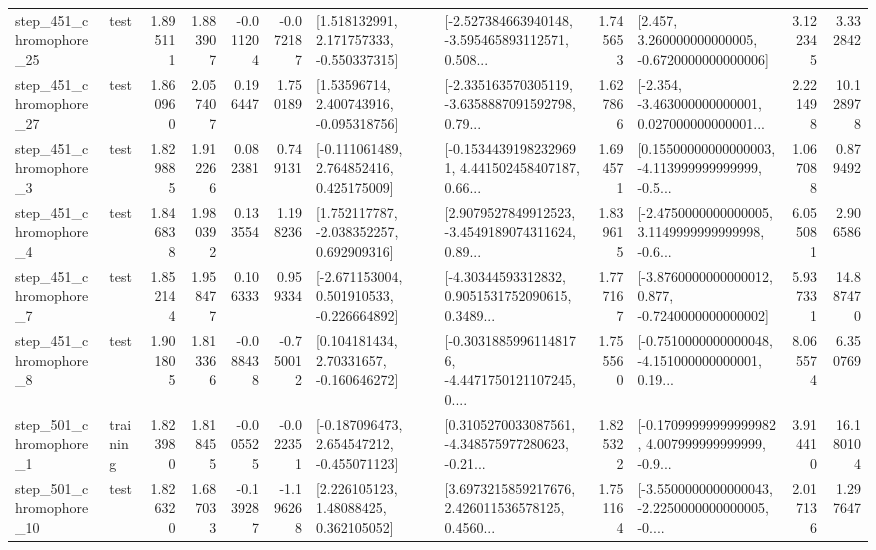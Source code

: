 \begin{tabular}{llrrrrllrlrr}
  step\_451\_chromophore\_25 &      test &      1.895111 &    1.883907 &     -0.011204 & -0.072187 &    [1.518132991, 2.171757333, -0.550337315] &  [-2.527384663940148, -3.595465893112571, 0.508... &       1.745653 &    [2.457, 3.260000000000005, -0.6720000000000006] &            3.122345 &          3.332842 \\
  step\_451\_chromophore\_27 &      test &      1.860960 &    2.057407 &      0.196447 &  1.750189 &     [1.53596714, 2.400743916, -0.095318756] &  [-2.335163570305119, -3.6358887091592798, 0.79... &       1.627866 &  [-2.354, -3.463000000000001, 0.027000000000001... &            2.221498 &         10.128978 \\
   step\_451\_chromophore\_3 &      test &      1.829885 &    1.912266 &      0.082381 &  0.749131 &    [-0.111061489, 2.764852416, 0.425175009] &  [-0.15344391982329691, 4.441502458407187, 0.66... &       1.694571 &  [0.15500000000000003, -4.113999999999999, -0.5... &            1.067088 &          0.879492 \\
   step\_451\_chromophore\_4 &      test &      1.846838 &    1.980392 &      0.133554 &  1.198236 &    [1.752117787, -2.038352257, 0.692909316] &  [2.9079527849912523, -3.4549189074311624, 0.89... &       1.839615 &  [-2.4750000000000005, 3.1149999999999998, -0.6... &            6.055081 &          2.906586 \\
   step\_451\_chromophore\_7 &      test &      1.852144 &    1.958477 &      0.106333 &  0.959334 &   [-2.671153004, 0.501910533, -0.226664892] &  [-4.30344593312832, 0.9051531752090615, 0.3489... &       1.777167 &  [-3.8760000000000012, 0.877, -0.7240000000000002] &            5.937331 &         14.887470 \\
   step\_451\_chromophore\_8 &      test &      1.901805 &    1.813366 &     -0.088438 & -0.750012 &     [0.104181434, 2.70331657, -0.160646272] &  [-0.30318859961148176, -4.4471750121107245, 0.... &       1.755560 &  [-0.7510000000000048, -4.151000000000001, 0.19... &            8.065574 &          6.350769 \\
   step\_501\_chromophore\_1 &  training &      1.823980 &    1.818455 &     -0.005525 & -0.022351 &   [-0.187096473, 2.654547212, -0.455071123] &  [0.3105270033087561, -4.348575977280623, -0.21... &       1.825322 &  [-0.17099999999999982, 4.007999999999999, -0.9... &            3.914410 &         16.180104 \\
  step\_501\_chromophore\_10 &      test &      1.826320 &    1.687033 &     -0.139287 & -1.196268 &      [2.226105123, 1.48088425, 0.362105052] &  [3.6973215859217676, 2.426011536578125, 0.4560... &       1.751164 &  [-3.5500000000000043, -2.2250000000000005, -0.... &            2.017136 &          1.297647 \\

\end{tabular}
